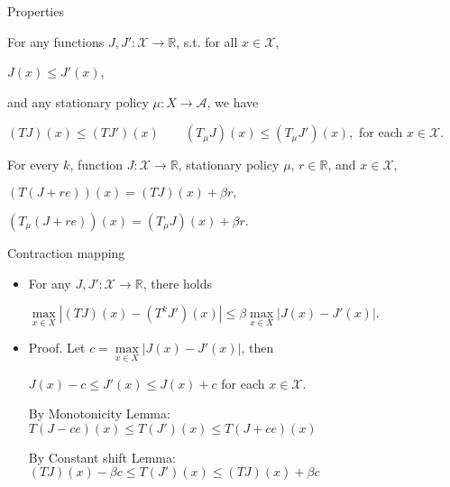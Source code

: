 \documentclass{beamer}
\def\R{{\mathbb R}}
\def\X{{\mathcal X}}
\def\A{{\mathcal A}}
\begin{document}
\begin{frame}{Properties}
\begin{theorem}[Monotonicity]
For any functions $J, J':\X\rightarrow \R$, s.t. for all $x\in \X$,
\begin{center}
$J(x)\leq J'(x)$,
\end{center}
and any stationary policy $\mu:X\rightarrow \A$, we have

\begin{center}
$(TJ)(x)\leq (T J')(x)\quad\quad(T_\mu J)(x)\leq (T_\mu J')(x),$ for each $x\in \X.$
\end{center}
\end{theorem}

\begin{theorem}
For every $k$, function $J:\X\rightarrow \R$, stationary policy $\mu$, $r\in \R$, and $x\in \X$,
\begin{center}
$(T(J+re))(x) = (TJ)(x) +\beta r,$
\end{center}
\begin{center}
$(T_\mu(J+re))(x) = (T_\mu J)(x) +\beta r.$
\end{center}
\end{theorem}


\end{frame}



\begin{frame}{Contraction mapping}

\begin{itemize}
\item For any $J, J':\X\rightarrow \R$, there holds
\begin{center}
  $\max\limits_{x\in X} |(T J)(x) - (T^k J')(x) |\leq \beta \max\limits_{x\in X}|J(x) - J'(x)|.$
\end{center}

\item Proof. Let $c = \max\limits_{x\in X}|J(x) - J'(x)| $, then

 $J(x) - c\leq J'(x)\leq J(x)+c$ for each $x\in \X.$

    By Monotonicity Lemma:
    $T(J-ce)(x)\leq T(J')(x)\leq T(J+ce)(x)$

    By Constant shift Lemma:
    $(TJ)(x) - \beta c\leq T(J')(x)\leq (TJ)(x) + \beta c$
\end{itemize}
\end{frame}
\end{document}
